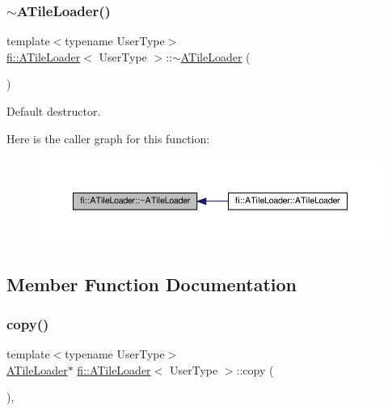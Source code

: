 \subsubsection{\texorpdfstring{$\sim$\+A\+Tile\+Loader()}{~ATileLoader()}}
{\footnotesize\ttfamily template$<$typename User\+Type$>$ \\
\hyperlink{classfi_1_1ATileLoader}{fi\+::\+A\+Tile\+Loader}$<$ User\+Type $>$\+::$\sim$\hyperlink{classfi_1_1ATileLoader}{A\+Tile\+Loader} (\begin{DoxyParamCaption}{ }\end{DoxyParamCaption})\hspace{0.3cm}{\ttfamily [default]}}



Default destructor. 

Here is the caller graph for this function\+:
\nopagebreak
\begin{figure}[H]
\begin{center}
\leavevmode
\includegraphics[width=350pt]{dc/d54/classfi_1_1ATileLoader_ab04d8b3add3187cfa57a0f5323f8f7b4_icgraph}
\end{center}
\end{figure}


\subsection{Member Function Documentation}
\mbox{\label{classfi_1_1ATileLoader_a6f842aefc3db84a1c95edaa9f550c1e7}} 
\subsubsection{\texorpdfstring{copy()}{copy()}}
{\footnotesize\ttfamily template$<$typename User\+Type$>$ \\
\hyperlink{classfi_1_1ATileLoader}{A\+Tile\+Loader}$\ast$ \hyperlink{classfi_1_1ATileLoader}{fi\+::\+A\+Tile\+Loader}$<$ User\+Type $>$\+::copy (\begin{DoxyParamCaption}{ }\end{DoxyParamCaption})\hspace{0.3cm}{\ttfamily [inline]}, {\ttfamily [final]}}




